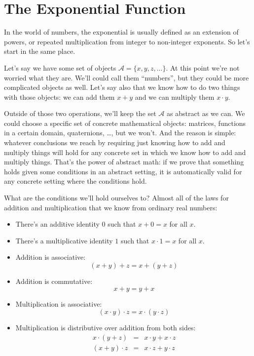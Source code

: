 \section{The Exponential Function}

In the world of numbers, the exponential is usually defined as an extension of powers, or repeated multiplication from integer to non-integer exponents. So let's start in the same place.

Let's say we have some set of objects $\mathcal{A}= \{x, y, z, \ldots\}$. At this point we're not worried what they are. We'll could call them ``numbers'', but they could be more complicated objects as well. Let's say also that we know how to do two things with those objects: we can add them $x + y$ and we can multiply them $x \cdot y$.

Outside of those two operations, we'll keep the set $\mathcal{A}$ as abstract as we can. We could choose a specific set of concrete mathematical objects: matrices, functions in a certain domain, quaternions, \ldots, but we won't. And the reason is simple: whatever conclusions we reach by requiring just knowing how to add and multiply things will hold for any concrete set in which we know how to add and multiply things. That's the power of abstract math: if we prove that something holds given some conditions in an abstract setting, it is automatically valid for any concrete setting where the conditions hold.

What are the conditions we'll hold ourselves to? Almost all of the laws for addition and multiplication that we know from ordinary real numbers:

\begin{itemize}
    \item There's an additive identity $0$ such that $x + 0 = x$ for all $x$.
    \item There's a multiplicative identity $1$ such that $x \cdot 1 = x$ for all $x$.
    \item Addition is associative:
        \begin{equation}
            \label{eq:addition_associativity}
            (x + y) + z = x + (y + z)
        \end{equation}
    \item Addition is commutative:
    \begin{equation}
        \label{eq:addition_commutativity}
        x + y = y + x
    \end{equation}
    \item Multiplication is associative:
    \begin{equation}
        \label{eq:multiplication_associativity}
        (x \cdot y) \cdot z = x \cdot (y \cdot z)
    \end{equation}
    \item Multiplication is distributive over addition from both sides:
    \begin{eqnarray}
        \label{eq:right_distributivity}
        x \cdot (y + z) &=& x \cdot y + x \cdot z   \\
        \label{eq:left_distributivity}
        (x + y) \cdot z &=& x \cdot z + y \cdot z
    \end{eqnarray}
\end{itemize}

